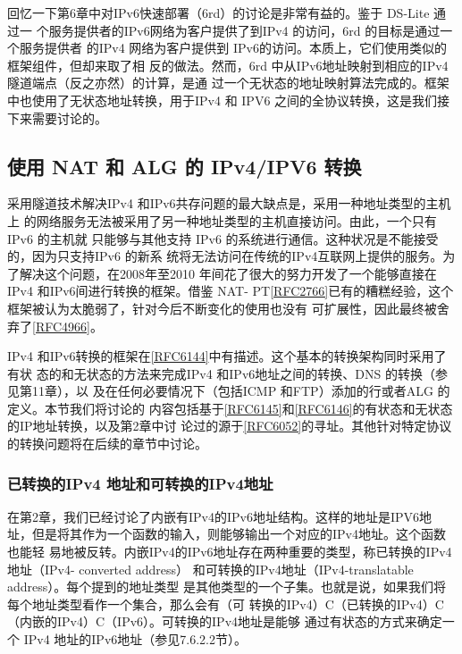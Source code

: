 回忆一下第6章中对IPv6快速部署（6rd）的讨论是非常有益的。鉴于 DS-Lite 通过一
个服务提供者的IPv6网络为客户提供了到IPv4 的访问，6rd 的目标是通过一个服务提供者
的IPv4 网络为客户提供到 IPv6的访问。本质上，它们使用类似的框架组件，但却来取了相
反的做法。然而，6rd 中从IPv6地址映射到相应的IPv4 隧道端点（反之亦然）的计算，是通
过一个无状态的地址映射算法完成的。框架中也使用了无状态地址转换，用于IPv4 和 IPV6
之间的全协议转换，这是我们接下来需要讨论的。

\subsection{使用 NAT 和 ALG 的 IPv4/IPV6 转换}

采用隧道技术解决IPv4 和IPv6共存问题的最大缺点是，采用一种地址类型的主机上
的网络服务无法被采用了另一种地址类型的主机直接访问。由此，一个只有IPv6 的主机就
只能够与其他支持 IPv6 的系统进行通信。这种状况是不能接受的，因为只支持IPv6 的新系
统将无法访问在传统的IPv4互联网上提供的服务。为了解决这个问题，在2008年至2010
年间花了很大的努力开发了一个能够直接在IPv4 和IPv6间进行转换的框架。借鉴 NAT-
PT\href{https://www.rfc-editor.org/rfc/rfc2766}{[RFC2766]}已有的糟糕经验，这个框架被认为太脆弱了，针对今后不断变化的使用也没有
可扩展性，因此最终被舍弃了\href{https://www.rfc-editor.org/rfc/rfc4966}{[RFC4966]}。

IPv4 和IPv6转换的框架在\href{https://www.rfc-editor.org/rfc/rfc6144}{[RFC6144]}中有描述。这个基本的转换架构同时采用了有状
态的和无状态的方法来完成IPv4 和IPv6地址之间的转换、DNS 的转换（参见第11章），以
及在任何必要情况下（包括ICMP 和FTP）添加的行或者ALG 的定义。本节我们将讨论的
内容包括基于\href{https://www.rfc-editor.org/rfc/rfc6145}{[RFC6145]}和\href{https://www.rfc-editor.org/rfc/rfc6146}{[RFC6146]}的有状态和无状态的IP地址转换，以及第2章中讨
论过的源于\href{https://www.rfc-editor.org/rfc/rfc6052}{[RFC6052]}的寻址。其他针对特定协议的转换问题将在后续的章节中讨论。

\subsubsection{已转换的IPv4 地址和可转换的IPv4地址}

在第2章，我们已经讨论了内嵌有IPv4的IPv6地址结构。这样的地址是IPV6地
址，但是将其作为一个函数的输入，则能够输出一个对应的IPv4地址。这个函数也能轻
易地被反转。内嵌IPv4的IPv6地址存在两种重要的类型，称已转换的IPv4地址（IPv4-
converted address） 和可转换的IPv4地址（IPv4-translatable address）。每个提到的地址类型
是其他类型的一个子集。也就是说，如果我们将每个地址类型看作一个集合，那么会有（可
转换的IPv4）C（已转换的IPv4）C（内嵌的IPv4）C（IPv6）。可转换的IPv4地址是能够
通过有状态的方式来确定一个 IPv4 地址的IPv6地址（参见7.6.2.2节）。

